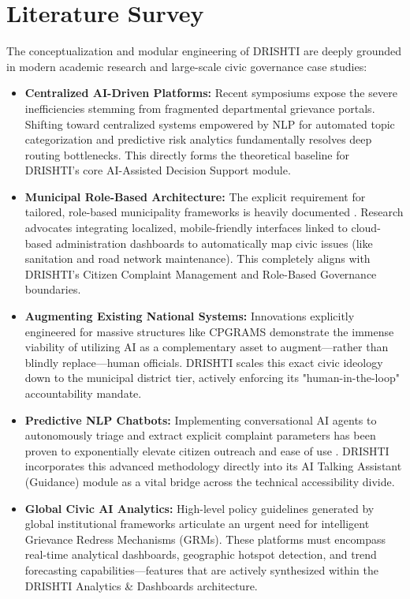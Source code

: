 \documentclass[12pt,a4paper]{report}
\begin{document}
\section{Literature Survey}
The conceptualization and modular engineering of DRISHTI are deeply grounded in modern academic research and large-scale civic governance case studies:

\begin{itemize}
    \item \textbf{Centralized AI-Driven Platforms:} Recent symposiums \cite{ref_icaaai} expose the severe inefficiencies stemming from fragmented departmental grievance portals. Shifting toward centralized systems empowered by NLP for automated topic categorization and predictive risk analytics fundamentally resolves deep routing bottlenecks. This directly forms the theoretical baseline for DRISHTI's core AI-Assisted Decision Support module.
    \item \textbf{Municipal Role-Based Architecture:} The explicit requirement for tailored, role-based municipality frameworks is heavily documented \cite{ref_aijmr}. Research advocates integrating localized, mobile-friendly interfaces linked to cloud-based administration dashboards to automatically map civic issues (like sanitation and road network maintenance). This completely aligns with DRISHTI's Citizen Complaint Management and Role-Based Governance boundaries.
    \item \textbf{Augmenting Existing National Systems:} Innovations explicitly engineered for massive structures like CPGRAMS \cite{ref_imoc} demonstrate the immense viability of utilizing AI as a complementary asset to augment—rather than blindly replace—human officials. DRISHTI scales this exact civic ideology down to the municipal district tier, actively enforcing its "human-in-the-loop" accountability mandate.
    \item \textbf{Predictive NLP Chatbots:} Implementing conversational AI agents to autonomously triage and extract explicit complaint parameters has been proven to exponentially elevate citizen outreach and ease of use \cite{ref_aip}. DRISHTI incorporates this advanced methodology directly into its AI Talking Assistant (Guidance) module as a vital bridge across the technical accessibility divide.
    \item \textbf{Global Civic AI Analytics:} High-level policy guidelines generated by global institutional frameworks \cite{ref_worldbank} articulate an urgent need for intelligent Grievance Redress Mechanisms (GRMs). These platforms must encompass real-time analytical dashboards, geographic hotspot detection, and trend forecasting capabilities—features that are actively synthesized within the DRISHTI Analytics \& Dashboards architecture.
\end{itemize}
\end{document}

